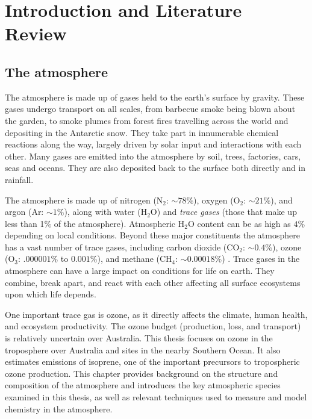 \chapter{Introduction and Literature Review} %
\label{LR}

\section{The atmosphere}
\label{LR:Atmos}
  The atmosphere is made up of gases held to the earth's surface by gravity. 
  These gases undergo transport on all scales, from barbecue smoke being blown about the garden, to smoke plumes from forest fires travelling across the world and depositing in the Antarctic snow.
  They take part in innumerable chemical reactions along the way, largely driven by solar input and interactions with each other.
  Many gases are emitted into the atmosphere by soil, trees, factories, cars, seas and oceans.
  They are also deposited back to the surface both directly and in rainfall.
  
  The atmosphere is made up of nitrogen (N$_2$: $\sim 78\%$), oxygen (O$_2$: 
  $\sim 21\%$), and argon (Ar: $\sim 1\%$), along with water (H$_2$O) and 
  \textit{trace gases} (those that make up less than 1\% of the atmosphere).
  Atmospheric H$_2$O content can be as high as $4\%$ depending on local 
  conditions.
  Beyond these major constituents the atmosphere has a vast number of trace 
  gases, including carbon dioxide (CO$_2$: $\sim 0.4\%$), ozone (O$_3$: 
  $.000001\%$ to $0.001\%$), and methane (CH$_4$: $\sim 0.00018\%$) 
  \parencite[][Ch. 2]{NOAAch4, BrasseurJacob2017}.
  Trace gases in the atmosphere can have a large impact on conditions for life on earth.
  They combine, break apart, and react with each other affecting all surface ecosystems upon which life depends.
  
  One important trace gas is ozone, as it directly affects the climate, human health, and ecosystem productivity.
  The ozone budget (production, loss, and transport) is relatively uncertain 
  over Australia.
  This thesis focuses on ozone in the troposphere over Australia and sites in 
  the nearby Southern Ocean.
  It also estimates emissions of isoprene, one of the important precursors to tropospheric ozone production.
  This chapter provides background on the structure and composition of the 
  atmosphere and introduces the key atmospheric species examined in this 
  thesis, as well as relevant techniques used to measure and model chemistry in 
  the atmosphere.
  
